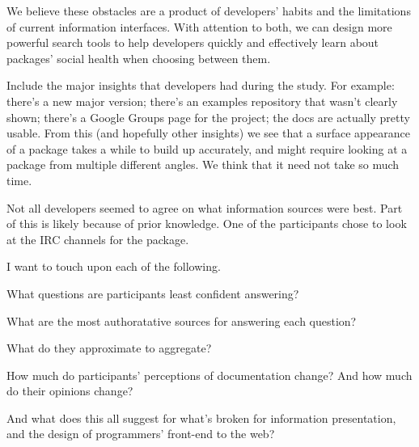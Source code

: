 We believe these obstacles are a product of developers' habits and the limitations of current information interfaces.
With attention to both, we can design more powerful search tools to help developers quickly and effectively learn about packages' social health when choosing between them.

Include the major insights that developers had during the study.
For example:
there's a new major version;
there's an examples repository that wasn't clearly shown;
there's a Google Groups page for the project;
the docs are actually pretty usable.
From this (and hopefully other insights) we see that a surface appearance of a package takes a while to build up accurately, and might require looking at a package from multiple different angles.
We think that it need not take so much time.

Not all developers seemed to agree on what information sources were best.
Part of this is likely because of prior knowledge.
One of the participants chose to look at the IRC channels for the package.

I want to touch upon each of the following.

What questions are participants least confident answering?

What are the most authoratative sources for answering each question?

What do they approximate to aggregate?

How much do participants' perceptions of documentation change?  And how much do their opinions change?

And what does this all suggest for what's broken for information presentation, and the design of programmers' front-end to the web?
\fi
